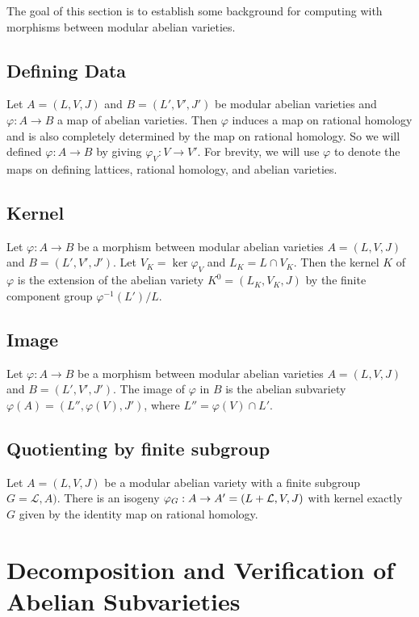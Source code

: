 The goal of this section is to establish some background for computing with
morphisms between modular abelian varieties.

\subsection{Defining Data}%
\label{sub:defining_data}

Let $A=(L, V, J)$ and $B=(L', V', J')$ be modular abelian varieties and
$\varphi:A\to B$ a map of abelian varieties. Then $\varphi$ induces a map on rational
homology and is also completely determined by the map on rational homology. So
we will defined $\varphi:A\to B$ by giving $\varphi_V:V\to V'$. For brevity, we will
use $\varphi$ to denote the maps on defining lattices, rational homology, and
abelian varieties.

\subsection{Kernel}%
\label{sub:kernel}

Let $\varphi:A\to B$ be a morphism between modular abelian varieties $A=(L, V, J)$
and $B=(L', V', J')$. Let $V_K=\ker \varphi_V$ and $L_K=L\cap V_K$. Then the
kernel $K$ of $\varphi$ is the extension of the abelian variety $K^0 = (L_K, V_K,
J)$ by the finite component group $\varphi^{-1}(L')/L$.

\subsection{Image}%
\label{sub:image}

Let $\varphi:A\to B$ be a morphism between modular abelian varieties $A=(L, V, J)$
and $B=(L', V', J')$. The image of $\varphi$ in $B$ is the abelian subvariety
$\varphi(A)=(L'', \varphi(V), J')$, where $L''=\varphi(V)\cap L'$.


\subsection{Quotienting by finite subgroup}%
\label{sub:quotienting_by_finite_subgroup}

Let $A=(L, V, J)$ be a modular abelian variety with a finite subgroup
$G=\mathcal{L}, A)$. There is an isogeny $\varphi_G: A\to A'=(L+\mathcal{L}, V,
J)$ with kernel exactly $G$ given by the identity map on rational homology.


\section{Decomposition and Verification of Abelian Subvarieties}
\label{sec:decomp_verify}

